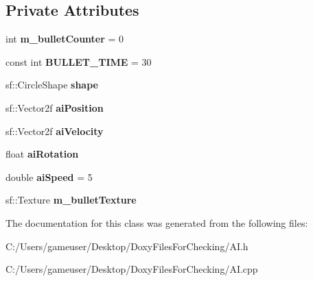 \subsection*{Private Attributes}
\begin{DoxyCompactItemize}
\item 
\mbox{\label{class_a_i_a3c8780b246bc21195a6d3c2b802b1941}} 
int {\bfseries m\+\_\+bullet\+Counter} = 0
\item 
\mbox{\label{class_a_i_ae2090a65abaae9720c3873a8459033f9}} 
const int {\bfseries B\+U\+L\+L\+E\+T\+\_\+\+T\+I\+ME} = 30
\item 
\mbox{\label{class_a_i_aa672ee9afaf3d7c4312ae03bace5a2f4}} 
sf\+::\+Circle\+Shape {\bfseries shape}
\item 
\mbox{\label{class_a_i_acda7a6c7d425af3c14b02e5a5b0b79b9}} 
sf\+::\+Vector2f {\bfseries ai\+Position}
\item 
\mbox{\label{class_a_i_ad3136b568efa57d2319ac7bcc60d8dec}} 
sf\+::\+Vector2f {\bfseries ai\+Velocity}
\item 
\mbox{\label{class_a_i_a4997155c89c95b9d6a2c7d560955c12e}} 
float {\bfseries ai\+Rotation}
\item 
\mbox{\label{class_a_i_aef3870a63b9fb0ee6922733f4c403930}} 
double {\bfseries ai\+Speed} = 5
\item 
\mbox{\label{class_a_i_a3cf613f84b0b2ac7efbeb59bdebba658}} 
sf\+::\+Texture {\bfseries m\+\_\+bullet\+Texture}
\end{DoxyCompactItemize}


The documentation for this class was generated from the following files\+:\begin{DoxyCompactItemize}
\item 
C\+:/\+Users/gameuser/\+Desktop/\+Doxy\+Files\+For\+Checking/A\+I.\+h\item 
C\+:/\+Users/gameuser/\+Desktop/\+Doxy\+Files\+For\+Checking/A\+I.\+cpp\end{DoxyCompactItemize}
